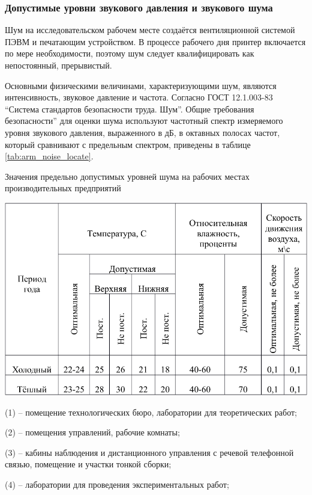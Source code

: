 \subsubsection{Допустимые уровни звукового давления и звукового шума}

Шум на исследовательском рабочем месте создаётся вентиляционной системой ПЭВМ и печатающим устройством. В процессе рабочего дня принтер включается по мере необходимости, поэтому шум следует квалифицировать как непостоянный, прерывистый.

Основными физическими величинами, характеризующими шум, являются интенсивность, звуковое давление и частота. Согласно ГОСТ 12.1.003-83 ``Система стандартов безопасности труда. Шум''\cite{gost_sec_noize}. Общие требования безопасности'' для оценки шума используют частотный спектр измеряемого уровня звукового давления, выраженного в дБ, в октавных полосах частот, который сравнивают с предельным спектром, приведены в таблице \ref{tab:arm_noise_locate}.

\begin{table}[!ht]
\caption{Значения предельно допустимых уровней шума на рабочих местах производительных предприятий}
\centering
\includegraphics[page=4, width=1\linewidth]{secure_table.pdf}
\label{tab:arm_noise_locate}
\end{table}

(1) – помещение технологических бюро, лаборатории для теоретических работ;

(2) – помещения управлений, рабочие комнаты;

(3) – кабины наблюдения и дистанционного управления с речевой телефонной связью, помещение и участки тонкой сборки;

(4) – лаборатории для проведения экспериментальных работ;

